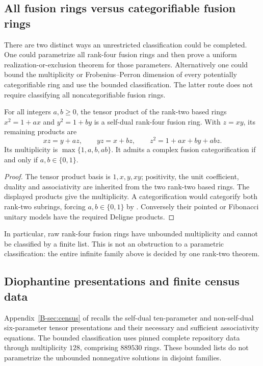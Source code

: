 \subsection{All fusion rings versus categorifiable fusion rings}
There are two distinct ways an unrestricted classification could be
completed. One could parametrize all rank-four fusion rings and then
prove a uniform realization-or-exclusion theorem for those parameters.
Alternatively one could bound the multiplicity or Frobenius--Perron
dimension of every potentially categorifiable ring and use the bounded
classification. The latter route does not require classifying all
noncategorifiable fusion rings.

\begin{proposition}\label{prop:raw-family}
For all integers $a,b\geq0$, the tensor product of the rank-two based rings
$x^2=1+ax$ and $y^2=1+by$ is a self-dual rank-four fusion ring. With
$z=xy$, its remaining products are
\[
 xz=y+az,\qquad yz=x+bz,\qquad
 z^2=1+ax+by+abz.
\]
Its multiplicity is $\max\{1,a,b,ab\}$. It admits a complex fusion
categorification if and only if $a,b\in\{0,1\}$.
\end{proposition}
\begin{proof}
The tensor product basis is $1,x,y,xy$; positivity, the unit coefficient,
duality and associativity are inherited from the two rank-two based rings.
The displayed products give the multiplicity. A categorification would
categorify both rank-two subrings, forcing $a,b\in\{0,1\}$ by \cite[Proposition~\ref{B-prop:ranktwo}]{Finite}. Conversely their pointed or Fibonacci unitary models
have the required Deligne products.
\end{proof}
In particular, raw rank-four fusion rings have unbounded multiplicity and
cannot be classified by a finite list. This is not an obstruction to a
parametric classification: the entire infinite family above is decided by
one rank-two theorem.

\subsection{Diophantine presentations and finite census data}
Appendix~\ref{B-sec:census} of \cite{Finite} recalls the self-dual
ten-parameter and non-self-dual six-parameter tensor presentations and
their necessary and sufficient associativity equations. The
bounded classification \cite{Finite} uses pinned complete repository
data through multiplicity $128$, comprising $889530$ rings. These
bounded lists do not parametrize the unbounded nonnegative solutions
in disjoint families.

